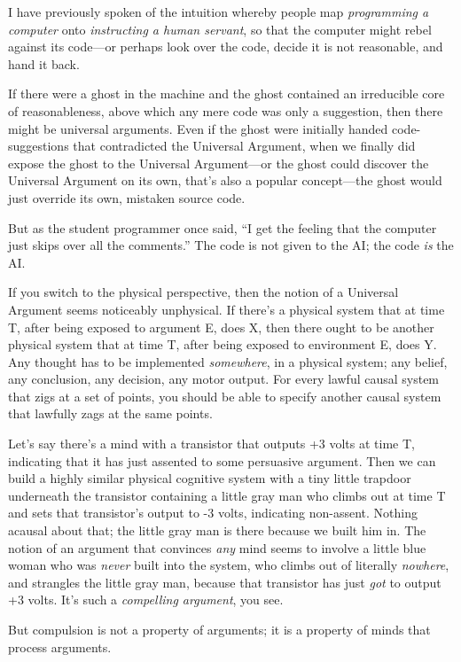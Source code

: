 {
 I have previously spoken of the intuition whereby people map
\textit{programming a computer} onto \textit{instructing a human
servant}, so that the computer might rebel against its code---or
perhaps look over the code, decide it is not reasonable, and hand it
back.}

{
 If there were a ghost in the machine and the ghost contained an
irreducible core of reasonableness, above which any mere code was only
a suggestion, then there might be universal arguments. Even if the
ghost were initially handed code-suggestions that contradicted the
Universal Argument, when we finally did expose the ghost to the
Universal Argument---or the ghost could discover the Universal Argument
on its own, that's also a popular concept---the ghost
would just override its own, mistaken source code.}

{
 But as the student programmer once said, ``I get
the feeling that the computer just skips over all the
comments.'' The code is not given to the AI; the code
\textit{is} the AI.}

{
 If you switch to the physical perspective, then the notion of a
Universal Argument seems noticeably unphysical. If
there's a physical system that at time T, after being
exposed to argument E, does X, then there ought to be another physical
system that at time T, after being exposed to environment E, does Y.
Any thought has to be implemented \textit{somewhere}, in a physical
system; any belief, any conclusion, any decision, any motor output. For
every lawful causal system that zigs at a set of points, you should be
able to specify another causal system that lawfully zags at the same
points.}

{
 Let's say there's a mind with a
transistor that outputs +3 volts at time T, indicating that it has just
assented to some persuasive argument. Then we can build a highly
similar physical cognitive system with a tiny little trapdoor
underneath the transistor containing a little gray man who climbs out
at time T and sets that transistor's output to -3
volts, indicating non-assent. Nothing acausal about that; the little
gray man is there because we built him in. The notion of an argument
that convinces \textit{any} mind seems to involve a little blue woman
who was \textit{never} built into the system, who climbs out of
literally \textit{nowhere}, and strangles the little gray man, because
that transistor has just \textit{got} to output +3 volts.
It's such a \textit{compelling argument}, you see.}

{
 But compulsion is not a property of arguments; it is a property of
minds that process arguments.}

